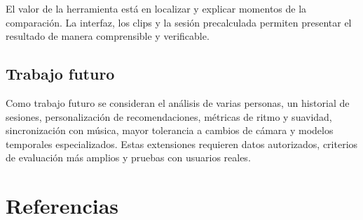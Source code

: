 \documentclass[12pt,a4paper]{article}
\begin{document}
El valor de la herramienta está en localizar y explicar momentos de la comparación. La interfaz, los clips y la sesión precalculada permiten presentar el resultado de manera comprensible y verificable.
\subsection{Trabajo futuro}
Como trabajo futuro se consideran el análisis de varias personas, un historial de sesiones, personalización de recomendaciones, métricas de ritmo y suavidad, sincronización con música, mayor tolerancia a cambios de cámara y modelos temporales especializados. Estas extensiones requieren datos autorizados, criterios de evaluación más amplios y pruebas con usuarios reales.

\section*{Referencias}
\nocite{aist,aistterms,mediapipe,dtw}
\printbibliography[heading=none]
\end{document}
